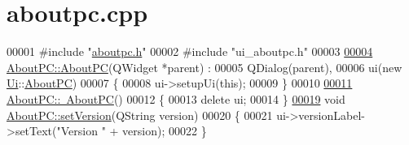 \hypertarget{aboutpc_8cpp_source}{}\section{aboutpc.\+cpp}

\begin{DoxyCode}
00001 \textcolor{preprocessor}{#include "\hyperlink{aboutpc_8h}{aboutpc.h}"}
00002 \textcolor{preprocessor}{#include "ui\_aboutpc.h"}
00003 
\hypertarget{aboutpc_8cpp_source.tex_l00004}{}\hyperlink{class_about_p_c_a89341c4427d97da60acf15dc929ad8a6}{00004} \hyperlink{class_about_p_c_a89341c4427d97da60acf15dc929ad8a6}{AboutPC::AboutPC}(QWidget *parent) :
00005     QDialog(parent),
00006     ui(new \hyperlink{namespace_ui}{Ui}::\hyperlink{class_about_p_c}{AboutPC})
00007 \{
00008     ui->setupUi(\textcolor{keyword}{this});
00009 \}
00010 
\hypertarget{aboutpc_8cpp_source.tex_l00011}{}\hyperlink{class_about_p_c_a3cc0c4c81abc640d946003b078a47dd4}{00011} \hyperlink{class_about_p_c_a3cc0c4c81abc640d946003b078a47dd4}{AboutPC::~AboutPC}()
00012 \{
00013     \textcolor{keyword}{delete} ui;
00014 \}
\hypertarget{aboutpc_8cpp_source.tex_l00019}{}\hyperlink{class_about_p_c_aa3815d4826d0c8d87122449537a0a4d5}{00019} \textcolor{keywordtype}{void} \hyperlink{class_about_p_c_aa3815d4826d0c8d87122449537a0a4d5}{AboutPC::setVersion}(QString version)
00020 \{
00021     ui->versionLabel->setText(\textcolor{stringliteral}{"Version "} + version);
00022 \}
\end{DoxyCode}
